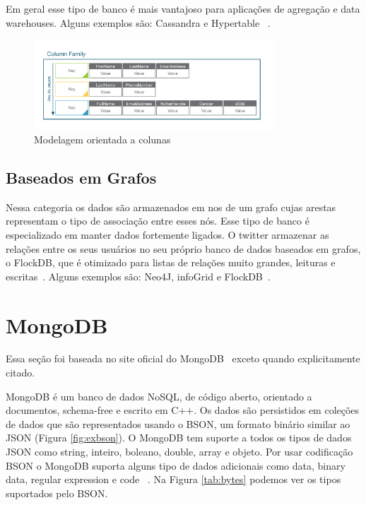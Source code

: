 Em geral esse tipo de banco é mais vantajoso para aplicações de agregação e data warehouses. Alguns exemplos são: Cassandra e  Hypertable ~\cite{nosqldatabaseorg}.



	\begin{figure}[!htbp]
		\begin{center}
			\includegraphics[width=0.8\textwidth]{columns}
		\end{center}
		\caption{Modelagem orientada a colunas}
		\label{fig:mdcolumns}
	\end{figure}


\subsection{Baseados em Grafos}

Nessa categoria os dados são armazenados em nos de um grafo cujas arestas representam o tipo de associação entre esses nós. Esse tipo de banco é especializado em manter dados fortemente ligados. O twitter armazenar as relações entre os seus usuários no seu próprio banco de dados baseados em grafos, o FlockDB, que é otimizado para listas de relações muito grandes, leituras e escritas~\cite{nosqlevaluation}.  Alguns exemplos são: Neo4J, infoGrid e FlockDB~\cite{nosqldatabaseorg}.

\section{MongoDB}


Essa seção foi baseada no site oficial do MongoDB~\cite{sitemongodb} exceto quando explicitamente citado.

MongoDB é um banco de dados NoSQL,  de código aberto,  orientado a documentos, schema-free e escrito em C++.  Os dados são persistidos em coleções de dados que são representados usando o BSON, um formato binário similar ao JSON (Figura \ref{fig:exbson}). O MongoDB tem suporte a todos os tipos de dados  JSON  como string, inteiro, boleano, double, array e objeto. Por usar codificação BSON o MongoDB suporta alguns tipo de dados adicionais como data, binary data, regular expression e code ~\cite{nosqlprofessional}. Na Figura \ref{tab:bytes} podemos ver os tipos suportados pelo BSON.

